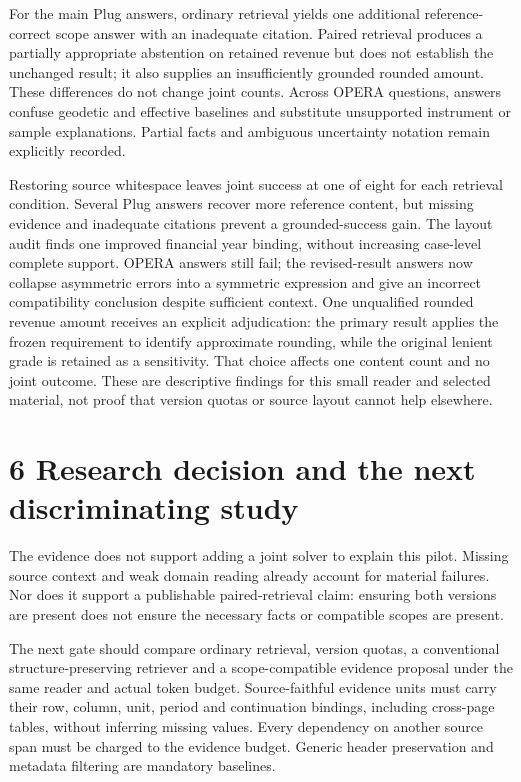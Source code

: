 \documentclass[11pt]{article}
\begin{document}
For the main Plug answers, ordinary retrieval yields one additional reference-correct scope answer with an inadequate citation. Paired retrieval produces a partially appropriate abstention on retained revenue but does not establish the unchanged result; it also supplies an insufficiently grounded rounded amount. These differences do not change joint counts. Across OPERA questions, answers confuse geodetic and effective baselines and substitute unsupported instrument or sample explanations. Partial facts and ambiguous uncertainty notation remain explicitly recorded.

Restoring source whitespace leaves joint success at one of eight for each retrieval condition. Several Plug answers recover more reference content, but missing evidence and inadequate citations prevent a grounded-success gain. The layout audit finds one improved financial year binding, without increasing case-level complete support. OPERA answers still fail; the revised-result answers now collapse asymmetric errors into a symmetric expression and give an incorrect compatibility conclusion despite sufficient context. One unqualified rounded revenue amount receives an explicit adjudication: the primary result applies the frozen requirement to identify approximate rounding, while the original lenient grade is retained as a sensitivity. That choice affects one content count and no joint outcome. These are descriptive findings for this small reader and selected material, not proof that version quotas or source layout cannot help elsewhere.

\section*{6  Research decision and the next discriminating study}
The evidence does not support adding a joint solver to explain this pilot. Missing source context and weak domain reading already account for material failures. Nor does it support a publishable paired-retrieval claim: ensuring both versions are present does not ensure the necessary facts or compatible scopes are present.

The next gate should compare ordinary retrieval, version quotas, a conventional structure-preserving retriever and a scope-compatible evidence proposal under the same reader and actual token budget. Source-faithful evidence units must carry their row, column, unit, period and continuation bindings, including cross-page tables, without inferring missing values. Every dependency on another source span must be charged to the evidence budget. Generic header preservation and metadata filtering are mandatory baselines.
\end{document}
